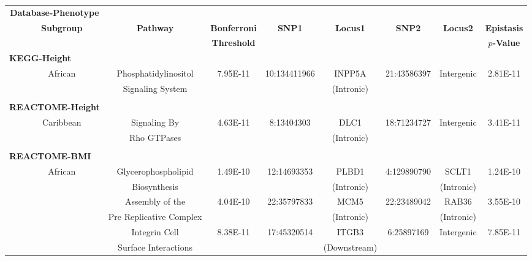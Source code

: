 \setlength{\footskip}{3.5cm}
\begin{landscape}
\begin{table}[ht]
\centering
\vspace{-1cm}
\hspace*{-2.5cm}
\begin{tabular}{ccccccccc}
  \hline
  \multicolumn{2}{c}{\textbf{Database-Phenotype}} & & & & & & & \\
  \cline{1-2}
  & \textbf{Subgroup} & \textbf{Pathway} & \textbf{Bonferroni} & \textbf{SNP1} & \textbf{Locus1} & \textbf{SNP2} & \textbf{Locus2} & \textbf{Epistasis} \\
  & & & \textbf{Threshold} & & & & & \textbf{$p$-Value}\\
  \hline
 \multicolumn{2}{l}{\textbf{KEGG-Height}} & & & & & & & \\
 & African & Phosphatidylinositol & 7.95E-11 & 10:134411966 & INPP5A & 21:43586397 & Intergenic & 2.81E-11 \\
 & & Signaling System & & & (Intronic) & & & \\
 & & & & & & & & \\
 \multicolumn{2}{l}{\textbf{REACTOME-Height}} & & & &  & & & \\
 & Caribbean & Signaling By & 4.63E-11 & 8:13404303 & DLC1 & 18:71234727 & Intergenic & 3.41E-11\\
 & & Rho GTPases & & & (Intronic) & & & \\
 & & & & & &  & & \\
 \multicolumn{2}{l}{\textbf{REACTOME-BMI}} & & &  & & & & \\
 & African & Glycerophospholipid & 1.49E-10 & 12:14693353 &  PLBD1 & 4:129890790 & SCLT1 & 1.24E-10 \\
 & & Biosynthesis & & & (Intronic) & & (Intronic) & \\
 & & Assembly of the & 4.04E-10 & 22:35797833 &  MCM5 & 22:23489042 & RAB36 & 3.55E-10 \\
 & & Pre Replicative Complex & & & (Intronic) & & (Intronic) & \\
 & & Integrin Cell & 8.38E-11 & 17:45320514 &  ITGB3 & 6:25897169  & Intergenic & 7.85E-11 \\
 & & Surface Interactions & & & (Downstream) & & & \\ 
   \hline
\end{tabular}

\end{table}
\end{landscape}
